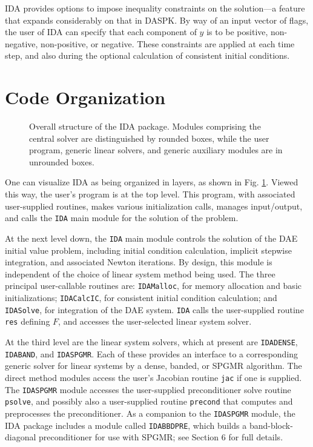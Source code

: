 \documentclass[11pt]{article}
\begin{document}
IDA provides options to impose inequality constraints on the
solution---a feature that expands considerably on that in DASPK.  By
way of an input vector of flags, the user of IDA can specify that each
component of $y$ is to be positive, non-negative, non-positive, or
negative.  These constraints are applied at each time step, and also
during the optional calculation of consistent initial conditions.


\section{Code Organization}

\begin{figure}[p]
\centerline{}
\caption{Overall structure of the IDA package.
  Modules comprising the central solver are distinguished by rounded
  boxes, while the user program, generic linear solvers, and generic 
  auxiliary  modules are in unrounded boxes.} 
\label{idaorg}
\end{figure}

One can visualize IDA as being organized in layers, as shown in
Fig. \ref{idaorg}.  Viewed this way, the user's program is at the top
level.  This program, with associated user-supplied routines, makes
various initialization calls, manages input/output, and calls the 
{\tt IDA} main module for the solution of the problem.

At the next level down, the {\tt IDA} main module controls the
solution of the DAE initial value problem, including initial condition
calculation, implicit stepwise integration, and associated Newton
iterations.  By design, this module is independent of the choice of
linear system method being used.  The three principal user-callable
routines are: {\tt IDAMalloc}, for memory allocation and basic
initializations; {\tt IDACalcIC}, for consistent initial condition
calculation; and {\tt IDASolve}, for integration of the DAE system.
{\tt IDA} calls the user-supplied routine {\tt res} defining $F$,
and accesses the user-selected linear system solver.

At the third level are the linear system solvers, which at present are
{\tt IDADENSE}, {\tt IDABAND}, and {\tt IDASPGMR}.  Each of these
provides an interface to a corresponding generic solver for linear
systems by a dense, banded, or SPGMR algorithm.  The direct method
modules access the user's Jacobian routine {\tt jac} if one is
supplied.  The {\tt IDASPGMR} module accesses the user-supplied
preconditioner solve routine {\tt psolve}, and possibly also a
user-supplied routine {\tt precond} that computes and preprocesses the
preconditioner.  As a companion to the {\tt IDASPGMR} module, the IDA
package includes a module called {\tt IDABBDPRE}, which builds a
band-block-diagonal preconditioner for use with SPGMR; see Section 6
for full details.
\end{document}
